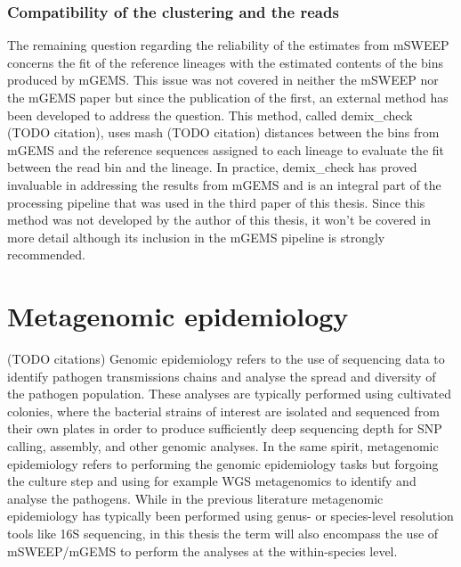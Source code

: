\documentclass[officiallayout]{tktla}
\begin{document}
\subsection{Compatibility of the clustering and the reads}
The remaining question regarding the reliability of the estimates from
mSWEEP concerns the fit of the reference lineages with the estimated
contents of the bins produced by mGEMS. This issue was not covered in
neither the mSWEEP nor the mGEMS paper but since the publication of
the first, an external method has been developed to address the
question. This method, called demix\_check (TODO citation), uses mash
(TODO citation) distances between the bins from mGEMS and the
reference sequences assigned to each lineage to evaluate the fit
between the read bin and the lineage. In practice, demix\_check has
proved invaluable in addressing the results from mGEMS and is an
integral part of the processing pipeline that was used in the third
paper of this thesis. Since this method was not developed by the
author of this thesis, it won't be covered in more detail although its
inclusion in the mGEMS pipeline is strongly recommended.


\chapter{Metagenomic epidemiology}
\label{section:metagenomic-epidemiology}

(TODO citations) Genomic epidemiology refers to the use of sequencing
data to identify pathogen transmissions chains and analyse the spread
and diversity of the pathogen population. These analyses are typically
performed using cultivated colonies, where the bacterial strains of
interest are isolated and sequenced from their own plates in order to
produce sufficiently deep sequencing depth for SNP calling, assembly,
and other genomic analyses. In the same spirit, metagenomic
epidemiology refers to performing the genomic epidemiology tasks but
forgoing the culture step and using for example WGS metagenomics to
identify and analyse the pathogens. While in the previous literature
metagenomic epidemiology has typically been performed using genus- or
species-level resolution tools like 16S sequencing, in this thesis the
term will also encompass the use of mSWEEP/mGEMS to perform the
analyses at the within-species level.
\end{document}
